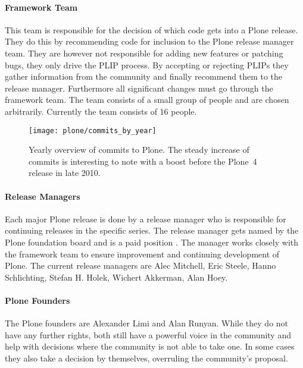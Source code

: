 \paragraph{Framework Team}

This team is responsible for the decision of which code gets into a Plone
release. They do this by recommending code for inclusion to the Plone release
manager team. They are however not responsible for adding new features or
patching bugs, they only drive the \ac{PLIP} process. By accepting or rejecting
\acp{PLIP} they gather information from the community and finally recommend
them to the release manager. Furthermore all significant changes must go
through the framework team. The team consists of a small group of people and
are chosen arbitrarily. Currently the team consists of 16 people.

\begin{figure}[thbp]
  \centering
  \texttt{[image: plone/commits\_by\_year]}
  \caption[Commits by Year, Plone]
  {Yearly overview of commits to Plone. The steady increase of commits is
    interesting to note with a boost before the Plone~4 release in late 2010.}
  \label{fig:plone:cby}
\end{figure}

\paragraph{Release Managers}

Each major Plone release is done by a release manager who is responsible for
continuing releases in the specific series. The release manager gets named by
the Plone foundation board and is a paid position
\cite{PlonePaidReleaseManager}. The manager works closely with the framework
team to ensure improvement and continuing development of Plone. The current
release managers are Alec Mitchell, Eric Steele, Hanno Schlichting, Stefan H.
Holek, Wichert Akkerman, Alan Hoey.

\paragraph{Plone Founders}

The Plone founders are Alexander Limi and Alan Runyan. While they do not have
any further rights, both still have a powerful voice in the community and help
with decisions where the community is not able to take one. In some cases they
also take a decision by themselves, overruling the community's proposal.

